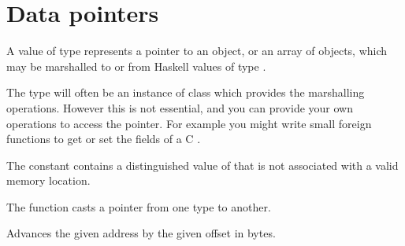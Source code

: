 \section{Data pointers}
\begin{haddockdesc}
\item[\begin{tabular}{@{}l}
data Ptr a
\end{tabular}]
{\haddockbegindoc
A value of type  represents a pointer to an object, or an
 array of objects, which may be marshalled to or from Haskell values
 of type .\par
The type  will often be an instance of class
  which provides the marshalling operations.
 However this is not essential, and you can provide your own operations
 to access the pointer.  For example you might write small foreign
 functions to get or set the fields of a C .\par}
\end{haddockdesc}
\begin{haddockdesc}
\item[\begin{tabular}{@{}l}
instance Storable Ptr a\\instance Show Ptr a\\instance Eq Ptr a\\instance Ord Ptr a\\\end{tabular}]
\end{haddockdesc}
\begin{haddockdesc}
\item[\begin{tabular}{@{}l}
nullPtr :: Ptr a
\end{tabular}]
{\haddockbegindoc
The constant  contains a distinguished value of 
 that is not associated with a valid memory location.\par}
\end{haddockdesc}
\begin{haddockdesc}
\item[\begin{tabular}{@{}l}
castPtr :: Ptr a -> Ptr b
\end{tabular}]
{\haddockbegindoc
The  function casts a pointer from one type to another.\par}
\end{haddockdesc}
\begin{haddockdesc}
\item[\begin{tabular}{@{}l}
plusPtr :: Ptr a -> Int -> Ptr b
\end{tabular}]
{\haddockbegindoc
Advances the given address by the given offset in bytes.\par}
\end{haddockdesc}
